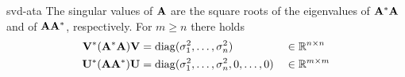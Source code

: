 \begin{Lemma}{svd-ata}
  The singular values of $\mathbf A$ are the square roots of the
  eigenvalues of $\mathbf A^*\mathbf A$ and of $\mathbf A\mathbf A^*$, respectively. For $m\ge n$ there holds
  \begin{align}
    \mathbf V^*(\mathbf A^*\mathbf A)\mathbf V &= \operatorname{diag}(\sigma_1^2,\dots,\sigma_n^2)
    &&\in \mathbb R^{n\times n}\\
    \mathbf U^*(\mathbf A\mathbf A^*)\mathbf U &= \operatorname{diag}(\sigma_1^2,\dots,\sigma_n^2, 0,\dots,0)
    &&\in \mathbb R^{m\times m}
  \end{align}
\end{Lemma}

